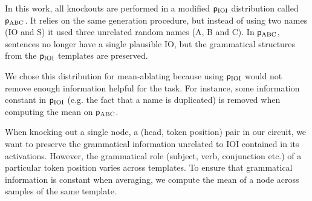 In this work, all knockouts are performed in a modified $\mathsf{p}_{\mathrm{IOI}}$ distribution called $\mathsf{p}_{\mathrm{ABC}}$. It relies on the same generation procedure, but instead of using two names (IO and S) it used three unrelated random names (A, B and C). In $\mathsf{p}_{\mathrm{ABC}}$, sentences no longer have a single plausible IO, but the grammatical structures from the $\mathsf{p}_{\mathrm{IOI}}$ templates are preserved.

We chose this distribution for mean-ablating because using $\mathsf{p}_{\mathrm{IOI}}$ would not remove enough information helpful for the task. For instance, some information constant in $\mathsf{p}_{\mathrm{IOI}}$ (e.g. the fact that a name is duplicated) is removed when computing the mean on $\mathsf{p}_{\mathrm{ABC}}$.

When knocking out a single node, a (head, token position) pair in our circuit, we want to preserve the grammatical information unrelated to IOI contained in its activations. However, the grammatical role (subject, verb, conjunction etc.) of a particular token position varies across templates. To ensure that grammatical information is constant when averaging, we compute the mean of a node across samples of the same template.







